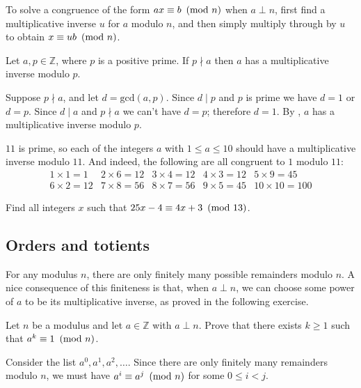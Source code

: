 \begin{prooftip}
To solve a congruence of the form $ax \equiv b ~\left(\text{mod}~n\right)$ when $a \perp n$, first find a multiplicative inverse $u$ for $a$ modulo $n$, and then simply multiply through by $u$ to obtain $x \equiv ub ~\left(\text{mod}~n\right)$.
\end{prooftip}

\begin{corollary}
Let $a,p \in \mathbb{Z}$, where $p$ is a positive prime. If $p \nmid a$ then $a$ has a multiplicative inverse modulo $p$.
\end{corollary}
\begin{cproof}
Suppose $p \nmid a$, and let $d = \mathrm{gcd}(a,p)$. Since $d \mid p$ and $p$ is prime we have $d=1$ or $d=p$. Since $d \mid a$ and $p \nmid a$ we can't have $d=p$; therefore $d=1$. By , $a$ has a multiplicative inverse modulo $p$.
\end{cproof}

\begin{example}
$11$ is prime, so each of the integers $a$ with $1 \le a \le 10$ should have a multiplicative inverse modulo $11$. And indeed, the following are all congruent to $1$ modulo $11$:
\[ \begin{matrix}
1 \times 1 = 1 & 2 \times 6 = 12 & 3 \times 4 = 12 & 4 \times 3 = 12 & 5 \times 9 = 45 \\ 6 \times 2 = 12 & 7 \times 8 = 56 & 8 \times 7 = 56 & 9 \times 5 = 45 & 10 \times 10 = 100
\end{matrix} \]
\end{example}

\begin{exercise}
Find all integers $x$ such that $25x-4 \equiv 4x+3 ~\left(\text{mod}~13\right)$.
\end{exercise}

\subsection*{Orders and totients}

For any modulus $n$, there are only finitely many possible remainders modulo $n$. A nice consequence of this finiteness is that, when $a \perp n$, we can choose some power of $a$ to be its multiplicative inverse, as proved in the following exercise.

\begin{exercise}
\label{exPowerModN}
Let $n$ be a modulus and let $a \in \mathbb{Z}$ with $a \perp n$. Prove that there exists $k \ge 1$ such that $a^k \equiv 1 ~\left(\text{mod}~n\right)$.
\begin{backhint}
Consider the list $a^0, a^1, a^2, \dots$. Since there are only finitely many remainders modulo $n$, we must have $a^i \equiv a^j ~\left(\text{mod}~n\right)$ for some $0 \le i < j$.
\end{backhint}
\end{exercise}

